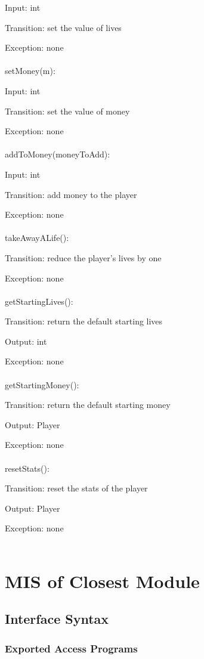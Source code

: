 \documentclass[12,english]{article}
\begin{document}
			Input: int
			
			Transition: set the value of lives
			
			Exception: none\\
			\\
		    setMoney(m):
			
			Input: int
			
			Transition: set the value of money
			
			Exception: none\\
			\\
			addToMoney(moneyToAdd):
			
			Input: int
			
			Transition: add money to the player
			
			Exception: none\\
			\\
			takeAwayALife():
			
			Transition: reduce the player's lives by one
			
			Exception: none\\
			\\
			getStartingLives():
			
			Transition: return the default starting lives
			
			Output: int
			
			Exception: none\\
			\\
			getStartingMoney():
			
			Transition: return the default starting money
			
			Output: Player
			
			Exception: none\\
			\\
			resetStats():
			
			Transition: reset the stats of the player
			
			Output: Player
			
			Exception: none\\
			\\
		

\section{MIS of Closest Module}
	\subsection{Interface Syntax}
		\subsubsection{Exported Access Programs}
		
\end{document}
